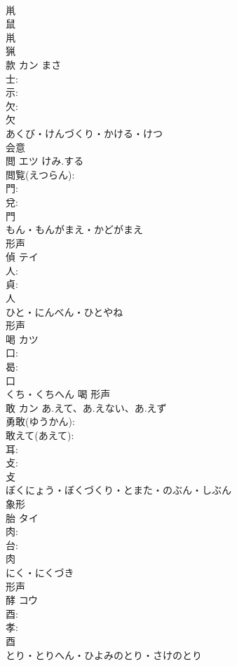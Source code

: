 \documentclass[8pt]{extreport}
\begin{document}
\begin{CJK}{UTF8}{min}
\\	鼡 
\\	鼠 
\\	鼡 
\\	猟 
\\	款	カン		まさ	
\\	士: 
\\	示: 
\\	欠: 
\\	欠	
\\	あくび・けんづくり・かける・けつ	
\\	会意 
\\	閲	エツ	けみ.する		
\\	閲覧(えつらん): 
\\	門: 
\\	兌: 
\\	門	
\\	もん・もんがまえ・かどがまえ	
\\	形声 
\\	偵	テイ			
\\	人: 
\\	貞: 
\\	人	
\\	ひと・にんべん・ひとやね	
\\	形声 
\\	喝	カツ			
\\	口: 
\\	曷: 
\\	口	
\\	くち・くちへん	喝	形声 
\\	敢	カン	あ.えて、あ.えない、あ.えず		
\\	勇敢(ゆうかん): 
\\	敢えて(あえて): 
\\	耳: 
\\	攴: 
\\	攴	
\\	ぼくにょう・ぼくづくり・とまた・のぶん・しぶん	
\\	象形 
\\	胎	タイ			
\\	肉: 
\\	台: 
\\	肉	
\\	にく・にくづき	
\\	形声 
\\	酵	コウ			
\\	酉: 
\\	孝: 
\\	酉	
\\	とり・とりへん・ひよみのとり・さけのとり	

\end{CJK}
\end{document}
